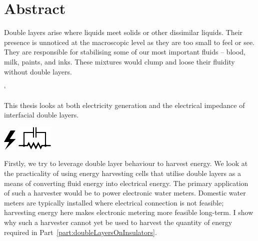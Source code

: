 





\rmfamily


\chapter*{Abstract}
  Double layers arise where liquids meet solids or other dissimilar liquids.
  Their presence is unnoticed at the macroscopic level as they are too small to feel or see.
  They are responsible for stabilising some of our most important fluids -- blood, milk, paints, and inks.
  These mixtures would clump and loose their fluidity without double layers.

  \vspace{-0.3cm}
  \begin{center}
    \parbox{8.8cm}{
     ` \begin{center}
        This thesis looks at both electricity generation and the electrical impedance of interfacial double layers.
      \end{center}
      \vspace{-1.35cm}
    }
    \vspace{-0.3cm}
    \parbox{15cm}{
        \hspace{0.8cm}
        \hbox{\vspace{-0.9cm}\includegraphics{graphics/logo_electricity}}
        \hbox{\hspace{9.8cm}\includegraphics{graphics/logo_impedance}}
    }
  \end{center}
  \vspace{0.5cm}

  Firstly, we try to leverage double layer behaviour to harvest energy.
  We look at the practicality of using energy harvesting cells that utilise double layers as a means of converting fluid energy into electrical energy.
  The primary application of such a harvester would be to power electronic water meters.
  Domestic water meters are typically installed where electrical connection is not feasible; harvesting energy here makes electronic metering more feasible long-term.
  I show why such a harvester cannot yet be used to harvest the quantity of energy required in Part~\ref{part:doubleLayersOnInsulators}.

